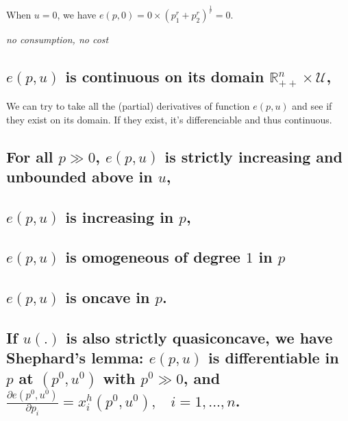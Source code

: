 \documentclass{article}
\newcommand{\R}{\mathbb{R}}
\begin{document}
When $u = 0$, we have $e(p,0) = 0 \times (p_1^{r} + p_2^{r})^{\frac{1}{r}} =0$.

\textit{no consumption, no cost}

\subsection{$e(p, u)$ is continuous on its domain $\R^n_{++} \times \mathcal{U}$,}

We can try to take all the (partial) derivatives of function $e(p, u)$ and see if they exist on its domain. If they exist, it's differenciable and thus continuous.


\subsection{For all $p \gg 0$, $e(p, u)$ is strictly increasing and unbounded above in $u$,}

\subsection{$e(p, u)$ is increasing in $p$,}


\subsection{$e(p, u)$ is omogeneous of degree $1$ in $p$}

\subsection{$e(p, u)$ is oncave in $p$.}

\subsection{If $u(.)$ is also strictly quasiconcave, we have Shephard’s lemma: $e(p, u)$ is differentiable in $p$ at $(p^0, u^0)$ with $p^0 \gg 0$, and $\frac{\partial e(p^0, u^0)}{\partial p_i} = x^h_i (p^0, u^0), \ \ \ \ i = 1, . . . , n$.}
\end{document}
